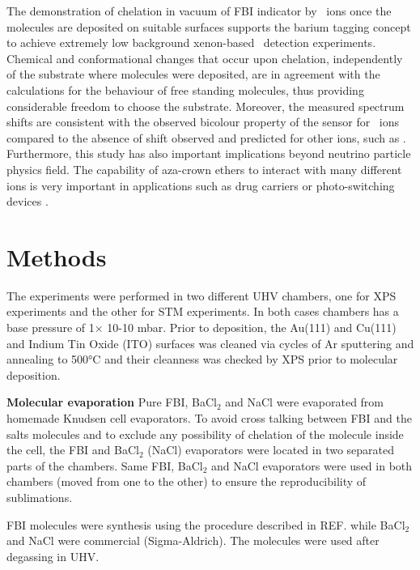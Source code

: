 \documentclass[aps,prl,reprint,longbibliography,superscriptaddress, english]{revtex4-1}
\def\BappCl{BaCl$_2$ }
\begin{document}
The demonstration of chelation in vacuum of FBI indicator by \Bapp\ ions once the molecules are deposited on suitable surfaces supports the barium tagging concept to achieve extremely low background xenon-based \bbonu\ {detection experiments}. Chemical and conformational changes that occur upon chelation, independently of the substrate where molecules were deposited, are in agreement with the calculations for the behaviour of free standing molecules, thus providing considerable freedom to choose the substrate. Moreover, the measured spectrum shifts are consistent with the observed {bicolour} property of the sensor for \Bapp\ ions compared to the {absence of} shift observed and predicted for other ions, such as \Nap.  
Furthermore, this study has also important implications beyond neutrino particle physics field. The capability of {aza-crown ethers} to interact with many different ions is very important in applications such as drug carriers \cite{uchegbu_non-ionic_1998} or photo-switching devices \cite{malval_photoswitching_2002,uda_membrane_2005}. 


\section{Methods}
The experiments were performed in two different UHV chambers, one for XPS experiments and the other for STM experiments. In both cases chambers has a base pressure of 1× 10-10 mbar. Prior to deposition, the Au(111) and Cu(111) and Indium Tin Oxide (ITO) surfaces was cleaned via cycles of Ar sputtering and annealing to 500°C and their cleanness was checked by XPS prior to molecular deposition. 

\textbf{Molecular evaporation}
Pure FBI, \BappCl and NaCl were evaporated from homemade Knudsen cell evaporators. To avoid cross talking between FBI and the salts molecules and to exclude any possibility of chelation of the molecule inside the cell, the FBI and \BappCl (NaCl) evaporators were located in two separated parts of the chambers. Same FBI, \BappCl and NaCl evaporators were used in both chambers (moved from one to the other) to ensure the reproducibility of sublimations.

FBI molecules were synthesis using the procedure described in REF.\cite{rivilla_fluorescent_2020} while \BappCl and NaCl were commercial (Sigma-Aldrich). The molecules were used after degassing in UHV.
\end{document}
